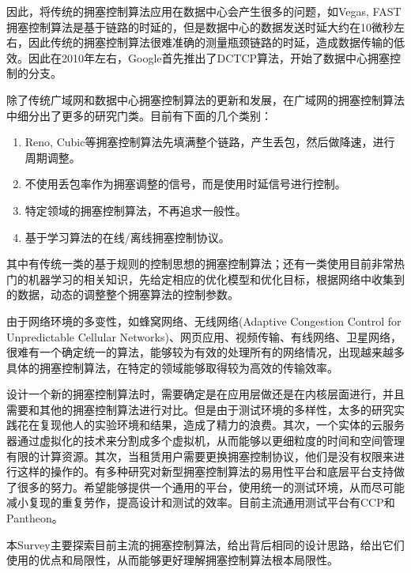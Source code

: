 \documentclass[a4paper, 12pt, UTF8]{ctexart}
\begin{document}
\par 因此，将传统的拥塞控制算法应用在数据中心会产生很多的问题，如Vegas, FAST拥塞控制算法是基于链路的时延的，但是数据中心的数据发送时延大约在10微秒左右，因此传统的拥塞控制算法很难准确的测量瓶颈链路的时延，造成数据传输的低效。因此在2010年左右，Google首先推出了DCTCP算法，开始了数据中心拥塞控制的分支。

\par 除了传统广域网和数据中心拥塞控制算法的更新和发展，在广域网的拥塞控制算法中细分出了更多的研究门类。目前有下面的几个类别：
\begin{enumerate}
	\item Reno, Cubic等拥塞控制算法先填满整个链路，产生丢包，然后做降速，进行周期调整。
	\item 不使用丢包率作为拥塞调整的信号，而是使用时延信号进行控制。
	\item 特定领域的拥塞控制算法，不再追求一般性。
	\item 基于学习算法的在线/离线拥塞控制协议。
\end{enumerate}
\par 其中有传统一类的基于规则的控制思想的拥塞控制算法；还有一类使用目前非常热门的机器学习的相关知识，先给定相应的优化模型和优化目标，根据网络中收集到的数据，动态的调整整个拥塞算法的控制参数。

\par 由于网络环境的多变性，如蜂窝网络、无线网络(Adaptive Congestion Control for Unpredictable Cellular Networks)、网页应用、视频传输、有线网络、卫星网络，很难有一个确定统一的算法，能够较为有效的处理所有的网络情况，出现越来越多具体的拥塞控制算法，在特定的领域能够取得较为高效的传输效率。

\par 设计一个新的拥塞控制算法时，需要确定是在应用层做还是在内核层面进行，并且需要和其他的拥塞控制算法进行对比。但是由于测试环境的多样性，太多的研究实践花在复现他人的实验环境和结果，造成了精力的浪费。其次，一个实体的云服务器通过虚拟化的技术来分割成多个虚拟机，从而能够以更细粒度的时间和空间管理有限的计算资源。其次，当租赁用户需要更换拥塞控制协议，他们是没有权限\cite{DBLP:conf/sigcomm/HeRAGFCA16}来进行这样的操作的。有多种研究对新型拥塞控制算法的易用性平台和底层平台\cite{DBLP:conf/usenix/YanMHRWLW18}支持做了很多的努力。希望能够提供一个通用的平台，使用统一的测试环境，从而尽可能减小复现的重复劳作，提高设计和测试的效率。目前主流通用测试平台有CCP和Pantheon。

\par 本Survey主要探索目前主流的拥塞控制算法，给出背后相同的设计思路，给出它们使用的优点和局限性，从而能够更好理解拥塞控制算法根本局限性。
\end{document}
